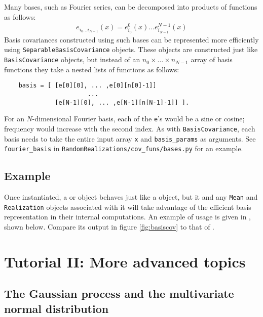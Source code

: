 \documentclass{manual}
\begin{document}
Many bases, such as Fourier series, can be decomposed into products of functions as follows:
\begin{eqnarray*}
    e_{i_0\ldots i_{N-1}}(x) = e^0_{i_0}(x)\ldots e^{N-1}_{i_{N-1}}(x)
\end{eqnarray*}
Basis covariances constructed using such bases can be represented more efficiently using \texttt{SeparableBasisCovariance} objects. These objects are constructed just like \texttt{BasisCovariance} objects, but instead of an $n_0\times \ldots \times n_{N-1}$ array of basis functions they take a nested lists of functions as follows:
\begin{verbatim}
    basis = [ [e[0][0], ... ,e[0][n[0]-1]]
                       ...
              [e[N-1][0], ... ,e[N-1][n[N-1]-1]] ].
\end{verbatim}
For an $N$-dimensional Fourier basis, each of the \texttt{e}'s would be a sine or cosine; frequency would increase with the second index. As with \texttt{BasisCovariance}, each basis needs to take the entire input array \texttt{x} and \texttt{basis_params} as arguments. See \texttt{fourier_basis} in \texttt{RandomRealizations/cov_funs/bases.py} for an example.

\section{Example} 

Once instantiated, a  or  object behaves just like a  object, but it and any \texttt{Mean} and \texttt{Realization} objects associated with it will take advantage of the efficient basis representation in their internal computations. An example of  usage is given in , shown below. Compare its output in figure \ref{fig:basiscov} to that of . 




\chapter{Tutorial II: More advanced topics}\label{cha:adv} %

\section{The Gaussian process and the multivariate normal distribution} 
\end{document}
